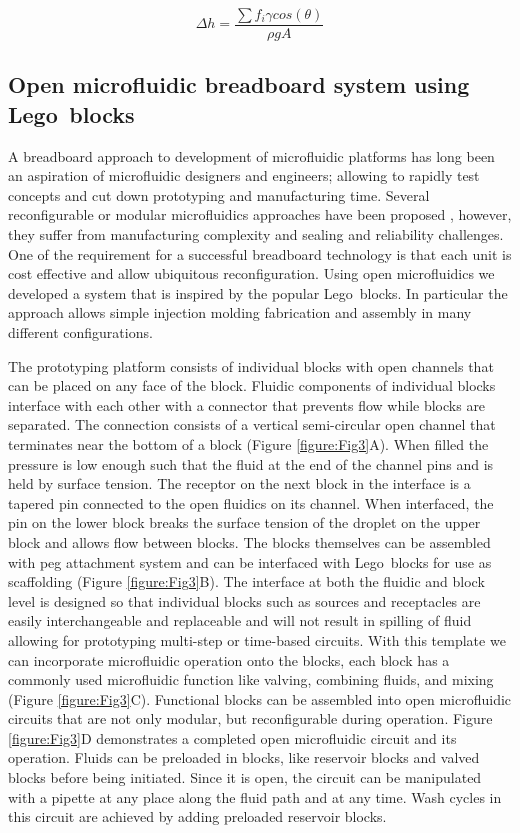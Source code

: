 \begin{equation}
    \Delta h= \frac{\sum f_{i}\gamma cos(\theta )}{\rho gA}
    \label{equation:Eq1}
\end{equation}

\subsection{Open microfluidic breadboard system using Lego\textregistered\, blocks}
A breadboard approach to development of microfluidic platforms has long been an aspiration of microfluidic designers and engineers; allowing to rapidly test concepts and cut down prototyping and manufacturing time. Several reconfigurable or modular microfluidics approaches have been proposed \cite{Bhargava2014, Chen2011, Frey2014,Shaikh2005}, however, they suffer from manufacturing complexity and sealing and reliability challenges. One of the requirement for a successful breadboard technology is that each unit is cost effective and allow ubiquitous reconfiguration. Using open microfluidics we developed a system that is inspired by the popular Lego\textregistered \, blocks. In particular the approach allows simple injection molding fabrication and assembly in many different configurations.

The prototyping platform consists of individual blocks with open channels that can be placed on any face of the block. Fluidic components of individual blocks interface with each other with a connector that prevents flow while blocks are separated. The connection consists of a vertical semi-circular open channel that terminates near the bottom of a block (Figure \ref{figure:Fig3}A). When filled the pressure is low enough such that the fluid at the end of the channel pins and is held by surface tension. The receptor on the next block in the interface is a tapered pin connected to the open fluidics on its channel. When interfaced, the pin on the lower block breaks the surface tension of the droplet on the upper block and allows flow between blocks. The blocks themselves can be assembled with peg attachment system and can be interfaced with Lego\textregistered \, blocks for use as scaffolding (Figure \ref{figure:Fig3}B). The interface at both the fluidic and block level is designed so that individual blocks such as sources and receptacles are easily interchangeable and replaceable and will not result in spilling of fluid allowing for prototyping multi-step or time-based circuits. With this template we can incorporate microfluidic operation onto the blocks, each block has a commonly used microfluidic function like valving, combining fluids, and mixing (Figure \ref{figure:Fig3}C). Functional blocks can be assembled into open microfluidic circuits that are not only modular, but reconfigurable during operation. Figure \ref{figure:Fig3}D demonstrates a completed open microfluidic circuit and its operation. Fluids can be preloaded in blocks, like reservoir blocks and valved blocks before being initiated. Since it is open, the circuit can be manipulated with a pipette at any place along the fluid path and at any time. Wash cycles in this circuit are achieved by adding preloaded reservoir blocks.


